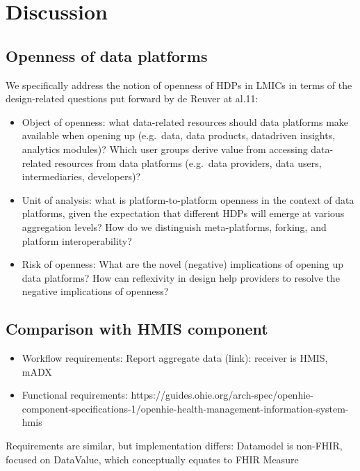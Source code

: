 \documentclass[
  authoryear]{elsarticle}
\providecommand{\tightlist}{%
  \setlength{\itemsep}{0pt}\setlength{\parskip}{0pt}}\usepackage{longtable,booktabs,array}
\begin{document}
\section{Discussion}\label{discussion}

\subsection{Openness of data
platforms}\label{openness-of-data-platforms}

We specifically address the notion of openness of HDPs in LMICs in terms
of the design-related questions put forward by de Reuver at al.11:

\begin{itemize}
\tightlist
\item
  Object of openness: what data-related resources should data platforms
  make available when opening up (e.g.~data, data products, datadriven
  insights, analytics modules)? Which user groups derive value from
  accessing data-related resources from data platforms (e.g.~data
  providers, data users, intermediaries, developers)?
\item
  Unit of analysis: what is platform-to-platform openness in the context
  of data platforms, given the expectation that different HDPs will
  emerge at various aggregation levels? How do we distinguish
  meta-platforms, forking, and platform interoperability?
\item
  Risk of openness: What are the novel (negative) implications of
  opening up data platforms? How can reflexivity in design help
  providers to resolve the negative implications of openness?
\end{itemize}

\subsection{Comparison with HMIS
component}\label{comparison-with-hmis-component}

\begin{itemize}
\tightlist
\item
  Workflow requirements: Report aggregate data (link): receiver is HMIS,
  mADX
\item
  Functional requirements:
  https://guides.ohie.org/arch-spec/openhie-component-specifications-1/openhie-health-management-information-system-hmis
\end{itemize}

Requirements are similar, but implementation differs: Datamodel is
non-FHIR, focused on DataValue, which conceptually equates to FHIR
Measure
\end{document}
